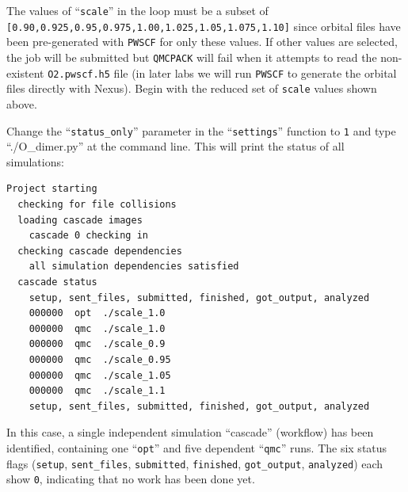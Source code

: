 The values of ``\texttt{scale}'' in the loop must be a subset of \newline \texttt{[0.90,0.925,0.95,0.975,1.00,1.025,1.05,1.075,1.10]} since orbital files have been pre-generated with \texttt{PWSCF} for only these values.  If other values are selected, the job will be submitted but \texttt{QMCPACK} will fail when it attempts to read the non-existent \texttt{O2.pwscf.h5} file (in later labs we will run \texttt{PWSCF} to generate the orbital files directly with Nexus).  Begin with the reduced set of \texttt{scale} values shown above.

Change the ``\texttt{status\_only}'' parameter in the ``\texttt{settings}'' function to \texttt{1} and type ``./O\_dimer.py'' at the command line.  This will print the status of all simulations:
\begin{shaded}
\begin{verbatim}
Project starting 
  checking for file collisions 
  loading cascade images 
    cascade 0 checking in 
  checking cascade dependencies 
    all simulation dependencies satisfied 
  cascade status 
    setup, sent_files, submitted, finished, got_output, analyzed 
    000000  opt  ./scale_1.0 
    000000  qmc  ./scale_1.0 
    000000  qmc  ./scale_0.9 
    000000  qmc  ./scale_0.95 
    000000  qmc  ./scale_1.05 
    000000  qmc  ./scale_1.1 
    setup, sent_files, submitted, finished, got_output, analyzed 
\end{verbatim}
\end{shaded}
\noindent
In this case, a single independent simulation ``cascade'' (workflow) has been identified, containing one ``\texttt{opt}'' and five dependent ``\texttt{qmc}'' runs.  The six status flags (\texttt{setup}, \texttt{sent\_files}, \texttt{submitted}, \texttt{finished}, \texttt{got\_output}, \texttt{analyzed}) each show \texttt{0}, indicating that no work has been done yet.  

